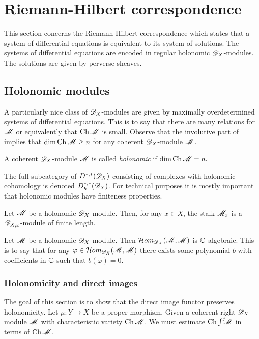 \section{Riemann-Hilbert correspondence}\label{sec: Riemann-Hilbert}
This section concerns the Riemann-Hilbert correspondence which states that a system of differential equations is equivalent to its system of solutions.
The systems of differential equations are encoded in regular holonomic $\mathscr{D}_X$-modules.
The solutions are given by perverse sheaves.
\subsection{Holonomic modules}
A particularly nice class of $\mathscr{D}_X$-modules are given by maximally overdetermined systems of differential equations.
This is to say that there are many relations for $\mathscr{M}$ or equivalently that $\operatorname{Ch}\mathscr{M}$ is small.
Observe that the involutive part of  implies that $\dim \operatorname{Ch}\mathscr{M} \geq n$ for any coherent $\mathscr{D}_X$-module $\mathscr{M}$.
\begin{definition}
  A coherent $\mathscr{D}_X$-module $\mathscr{M}$ is called {\it holonomic} if
  $\dim \operatorname{Ch} \mathscr{M}  = n.$
\end{definition}
The full subcategory of $D^{*,*}(\mathscr{D}_X)$ consisting of complexes with holonomic cohomology is denoted $D_h^{*,*}(\mathscr{D}_X)$.
For technical purposes it is mostly important that holonomic modules have finiteness properties.
\begin{proposition}{\cite[Proposition 4.42]{kashiwara2003d}}\label{prop: FiniteLength}
  Let $\mathscr{M}$ be a holonomic $\mathscr{D}_X$-module. Then, for any $x\in X$, the stalk $\mathscr{M}_x$ is a $\mathscr{D}_{X,x}$-module of finite length.
\end{proposition}
\begin{proposition}{\cite[Chapter 5, Proposition 9.2]{bjork1979rings}}\label{prop: HomAlgebraic}
  Let $\mathscr{M}$ be a holonomic $\mathscr{D}_X$-module.
  Then $\mathcal{H}om_{\mathscr{D}_X}(\mathscr{M},\mathscr{M})$ is $\mathbb{C}$-algebraic.
  This is to say that for any $\varphi \in\mathcal{H}om_{\mathscr{D}_X}(\mathscr{M},\mathscr{M}) $ there exists some polynomial $b$ with coefficients in $\mathbb{C}$ such that $b(\varphi)=0$.
\end{proposition}
\subsubsection{Holonomicity and direct images}
The goal of this section is to show that the direct image functor preserves holonomicity.
Let $\mu:Y\to X$ be a proper morphism.
Given a coherent right $\mathscr{D}_X$-module $\mathscr{M}$ with characteristic variety $\operatorname{Ch} \mathscr{M}$.
We must estimate $\operatorname{Ch} \int^j \mkern -8mu \mathscr{M}$ in terms of $\operatorname{Ch}\mathscr{M}$.


